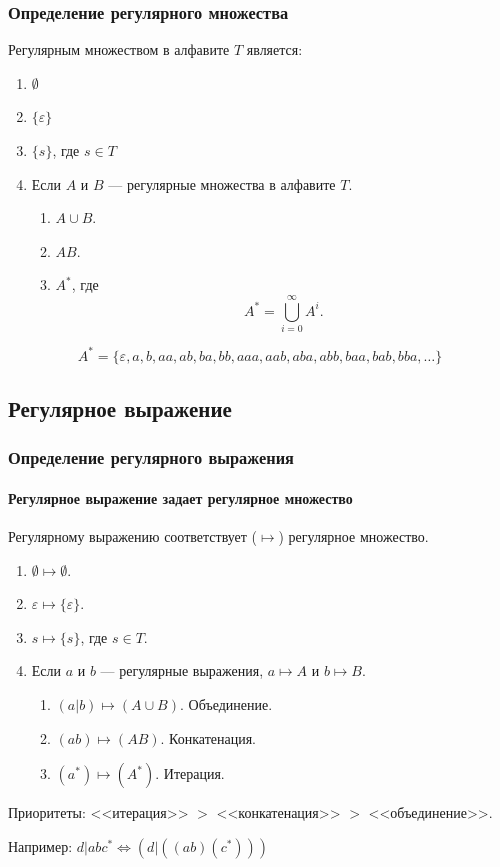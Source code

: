\begin{frame}
    \frametitle{Определение регулярного множества}
    
    Регулярным множеством в алфавите $T$ является:
    \begin{enumerate}
        \item $\emptyset$
        \item $\{\varepsilon\}$
        \item $\{s\}$, где $s\in T$
        \item Если $A$ и $B$ --- регулярные множества в алфавите $T$.
        \begin{enumerate}
            \item $A\cup B$.
            \item $AB$.
            \item $A^*$, где
                \[A^*=\bigcup_{i=0}^{\infty}A^i.\]
        \end{enumerate}
    \end{enumerate}
    \begin{example}[$A=\{a,b\}$]
        \[A^*=\{\varepsilon,a,b,aa,ab,ba,bb,aaa,aab,aba,abb,baa,bab,bba,\ldots\}\]
    \end{example}
\end{frame}


\subsection{Регулярное выражение}

\begin{frame}
    \frametitle{Определение регулярного выражения}
    \framesubtitle{Регулярное выражение задает регулярное множество}
    
    Регулярному выражению соответствует ($\mapsto$) регулярное множество.
    \begin{enumerate}
        \item $\emptyset\mapsto\emptyset$.
        \item $\varepsilon\mapsto\{\varepsilon\}$.
        \item $s\mapsto\{s\}$, где $s\in T$.
        \item Если $a$ и $b$ --- регулярные выражения, $a\mapsto A$ и $b\mapsto B$.
        \begin{enumerate}
            \item $(a|b)\mapsto (A\cup B)$. Объединение.
            \item $(ab)\mapsto (AB)$. Конкатенация.
            \item $(a^*)\mapsto (A^*)$. Итерация.
        \end{enumerate}
    \end{enumerate}
    
    Приоритеты: <<итерация>> $>$ <<конкатенация>> $>$ <<объединение>>. 
    
    Например: $d|abc^*\Leftrightarrow(d|((ab)(c^*)))$
\end{frame}

